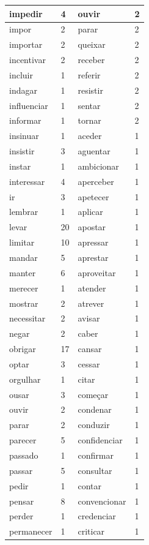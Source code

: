 \documentclass[output=paper,colorlinks,citecolor=brown]{langscibook}
\begin{document}
\begin{longtable}{ p{3cm} | p{1cm} | p{3cm} | p{1cm} }
		impedir & 4 & ouvir & 2\\\hline
		impor & 2 & parar & 2\\\hline
		importar & 2 & queixar & 2\\\hline
		incentivar & 2 & receber & 2\\\hline
		incluir & 1 & referir & 2\\\hline
		indagar & 1 & resistir & 2\\\hline
		influenciar & 1 & sentar & 2\\\hline
		informar & 1 & tornar & 2\\\hline
		insinuar & 1 & aceder & 1\\\hline
		insistir & 3 & aguentar & 1\\\hline
		instar & 1 & ambicionar & 1\\\hline
		interessar & 4 & aperceber & 1\\\hline
		ir & 3 & apetecer & 1\\\hline
		lembrar & 1 & aplicar & 1\\\hline
		levar & 20 & apostar & 1\\\hline
		limitar & 10 & apressar & 1\\\hline
		mandar & 5 & aprestar & 1\\\hline
		manter & 6 & aproveitar & 1\\\hline
		merecer & 1 & atender & 1\\\hline
		mostrar & 2 & atrever & 1\\\hline
		necessitar & 2 & avisar & 1\\\hline
		negar & 2 & caber & 1\\\hline
		obrigar & 17 & cansar & 1\\\hline
		optar & 3 & cessar & 1\\\hline
		orgulhar & 1 & citar & 1\\\hline
		ousar & 3 & começar & 1\\\hline
		ouvir & 2 & condenar & 1\\\hline
		parar & 2 & conduzir & 1\\\hline
		parecer & 5 & confidenciar & 1\\\hline
		passado & 1 & confirmar & 1\\\hline
		passar & 5 & consultar & 1\\\hline
		pedir & 1 & contar & 1\\\hline
		pensar & 8 & convencionar & 1\\\hline
		perder & 1 & credenciar & 1\\\hline
		permanecer & 1 & criticar & 1\\\hline

\end{longtable}
\end{document}
